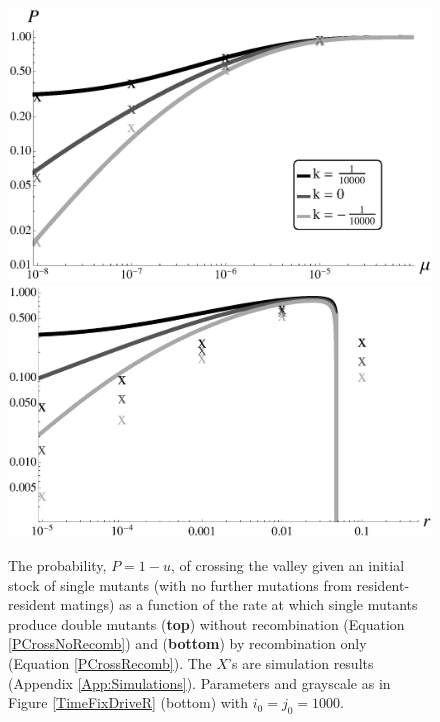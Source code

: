 \documentclass[review,3p,authoryear]{elsarticle}
\begin{document}
\begin{figure}[t]
\centering
\includegraphics[width=0.75\linewidth]{IMAGES/ProbFixDriveMutSimsBW.eps}
\includegraphics[width=0.75\linewidth]{IMAGES/ProbFixDriveRSimsBW.eps}
\caption{
The probability, $P=1-u$, of crossing the valley given an initial stock of single mutants (with no further mutations from resident-resident matings) as a function of the rate at which single mutants produce double mutants (\textbf{top}) without recombination (Equation \ref{PCrossNoRecomb}) and (\textbf{bottom}) by recombination only (Equation \ref{PCrossRecomb}).
The $X$'s are simulation results (Appendix \ref{App:Simulations}).
Parameters and grayscale as in Figure \ref{TimeFixDriveR} (bottom) with $i_0=j_0=1000$. 
}
\label{ProbFixDriveMut}
\end{figure}
\end{document}
